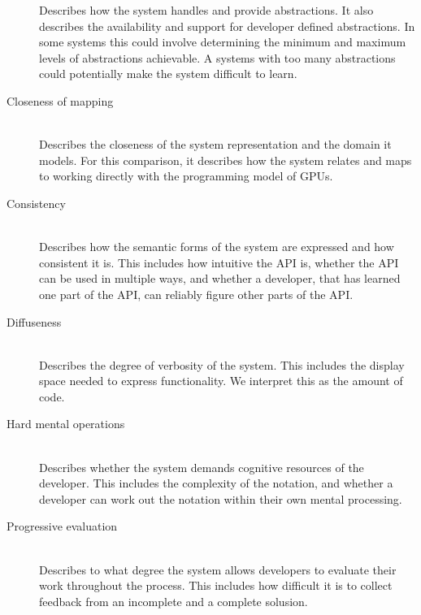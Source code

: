 \begin{description}
    Describes how the system handles and provide abstractions. It also describes the availability and support for developer defined abstractions. In some systems this could involve determining the minimum and maximum levels of abstractions achievable. A systems with too many abstractions could potentially make the system difficult to learn.
    \item[Closeness of mapping]\hfill\\
    Describes the closeness of the system representation and the domain it models. For this comparison, it describes how the system relates and maps to working directly with the programming model of GPUs.  
    \item[Consistency]\hfill\\
    Describes how the semantic forms of the system are expressed and how consistent it is. This includes how intuitive the API is, whether the API can be used in multiple ways, and whether a developer, that has learned one part of the API, can reliably figure other parts of the API. 
    \item[Diffuseness]\hfill\\
    Describes the degree of verbosity of the system. This includes the display space needed to express functionality. We interpret this as the amount of code.
    \item[Hard mental operations]\hfill\\
    Describes whether the system demands cognitive resources of the developer. This includes the complexity of the notation, and whether a developer can work out the notation within their own mental processing.
    \item[Progressive evaluation]\hfill\\ %
    Describes to what degree the system allows developers to evaluate their work throughout the process. This includes how difficult it is to collect feedback from an incomplete and a complete solusion.
\end{description}